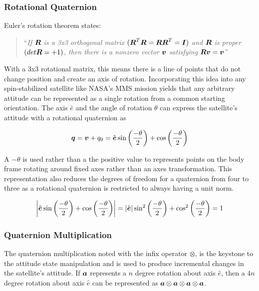 \subsubsection{Rotational Quaternion}
\label{subsubsec:RotationalQuaternion}

Euler's rotation theorem states:

\begin{quote}{``\textsl{If $\boldsymbol{R}$ is a 3x3 orthogonal matrix $( \boldsymbol{R}^T \boldsymbol{R} = \boldsymbol{R}\boldsymbol{R}^T = \boldsymbol{I} )$ and $\boldsymbol{R}$ is proper $( det \boldsymbol{R} = +1 )$, then there is a nonzero vector $\boldsymbol{v}$ satisfying $\boldsymbol{Rv} = \boldsymbol{v}$}''~\cite{euler_theorem}}\end{quote}

With a 3x3 rotational matrix, this means there is a line of points that do not change position and create an axis of rotation.  Incorporating this idea into any spin-stabilized satellite like NASA's MMS mission yields that any arbitrary attitude can be represented as a single rotation from a common starting orientation.  The axis $\hat{e}$ and the angle of rotation $\theta$ can express the satellite's attitude with a rotational quaternion as

\begin{equation}
  \boldsymbol{q} = \boldsymbol{v} + q_0 = \hat{\boldsymbol{e}} \sin \left( \frac{-\theta}{2} \right) + \cos \left( \frac{-\theta}{2} \right)
  \label{eqn:RotationalQuaternionDefinition}
\end{equation}

A $-\theta$ is used rather than a the positive value to represents points on the body frame rotating around fixed axes rather than an axes transformation.  This representation also reduces the degrees of freedom for a quaternion from four to three as a rotational quaternion is restricted to always having a unit norm.

\begin{equation}
  \left| \hat{\boldsymbol{e}} \sin \left( \frac{-\theta}{2} \right) + \cos \left( \frac{-\theta}{2} \right) \right| = \left| \hat{\boldsymbol{e}} \right|  \sin^2 \left( \frac{-\theta}{2} \right) + \cos^2 \left( \frac{-\theta}{2} \right) = 1
\end{equation}

\subsubsection{Quaternion Multiplication}
\label{subsubsec:QuaternionMultiplication}

The quaternion multiplication noted with the infix operator $\otimes$, is the keystone to the attitude state manipulation and is used to produce incremental changes in the satellite's attitude.  If $\boldsymbol{a}$ represents a $n$ degree rotation about axis $\hat{e}$, then a $4n$ degree rotation about axis $\hat{e}$ can be represented as $\boldsymbol{a} \otimes \boldsymbol{a} \otimes \boldsymbol{a} \otimes \boldsymbol{a}$.

